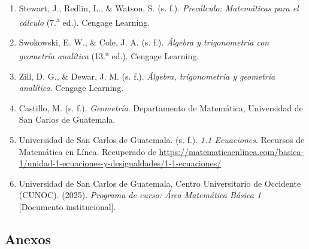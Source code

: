 \documentclass[12pt]{article}
\begin{document}
	\begin{enumerate}
		\item Stewart, J., Redlin, L., \& Watson, S. (s. f.). \textit{Precálculo: Matemáticas para el cálculo} (7.\textsuperscript{a} ed.). Cengage Learning.
		
		\item Swokowski, E. W., \& Cole, J. A. (s. f.). \textit{Álgebra y trigonometría con geometría analítica} (13.\textsuperscript{a} ed.). Cengage Learning.
		
		\item Zill, D. G., \& Dewar, J. M. (s. f.). \textit{Álgebra, trigonometría y geometría analítica}. Cengage Learning.
		
		\item Castillo, M. (s. f.). \textit{Geometría}. Departamento de Matemática, Universidad de San Carlos de Guatemala.
		
		\item Universidad de San Carlos de Guatemala. (s. f.). \textit{1.1 Ecuaciones}. Recursos de Matemática en Línea. Recuperado de \url{https://matematicaenlinea.com/basica-1/unidad-1-ecuaciones-y-desigualdades/1-1-ecuaciones/}
		
		\item Universidad de San Carlos de Guatemala, Centro Universitario de Occidente (CUNOC). (2025). \textit{Programa de curso: Área Matemática Básica 1} [Documento institucional].
	\end{enumerate}
	
	
	
		
	\subsection{Anexos}
	
	
	

	
	
	
	
\end{document}
